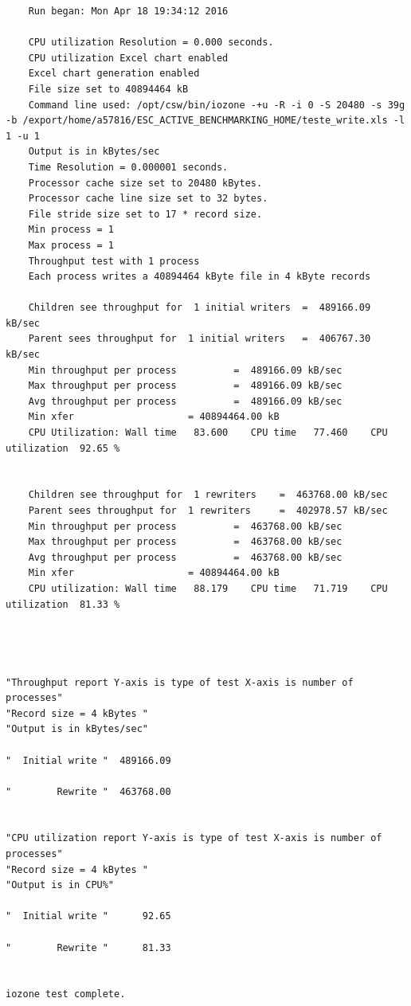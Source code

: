 \documentclass[a4paper]{article}
\begin{document}
{\begin{lstlisting}
	Run began: Mon Apr 18 19:34:12 2016

	CPU utilization Resolution = 0.000 seconds.
	CPU utilization Excel chart enabled
	Excel chart generation enabled
	File size set to 40894464 kB
	Command line used: /opt/csw/bin/iozone -+u -R -i 0 -S 20480 -s 39g -b /export/home/a57816/ESC_ACTIVE_BENCHMARKING_HOME/teste_write.xls -l 1 -u 1
	Output is in kBytes/sec
	Time Resolution = 0.000001 seconds.
	Processor cache size set to 20480 kBytes.
	Processor cache line size set to 32 bytes.
	File stride size set to 17 * record size.
	Min process = 1 
	Max process = 1 
	Throughput test with 1 process
	Each process writes a 40894464 kByte file in 4 kByte records

	Children see throughput for  1 initial writers 	=  489166.09 kB/sec
	Parent sees throughput for  1 initial writers 	=  406767.30 kB/sec
	Min throughput per process 			=  489166.09 kB/sec 
	Max throughput per process 			=  489166.09 kB/sec
	Avg throughput per process 			=  489166.09 kB/sec
	Min xfer 					= 40894464.00 kB
	CPU Utilization: Wall time   83.600    CPU time   77.460    CPU utilization  92.65 %


	Children see throughput for  1 rewriters 	=  463768.00 kB/sec
	Parent sees throughput for  1 rewriters 	=  402978.57 kB/sec
	Min throughput per process 			=  463768.00 kB/sec 
	Max throughput per process 			=  463768.00 kB/sec
	Avg throughput per process 			=  463768.00 kB/sec
	Min xfer 					= 40894464.00 kB
	CPU utilization: Wall time   88.179    CPU time   71.719    CPU utilization  81.33 %




"Throughput report Y-axis is type of test X-axis is number of processes"
"Record size = 4 kBytes "
"Output is in kBytes/sec"

"  Initial write "  489166.09 

"        Rewrite "  463768.00 


"CPU utilization report Y-axis is type of test X-axis is number of processes"
"Record size = 4 kBytes "
"Output is in CPU%"

"  Initial write "      92.65 

"        Rewrite "      81.33 


iozone test complete.
\end{lstlisting}
 
}
\end{document}

